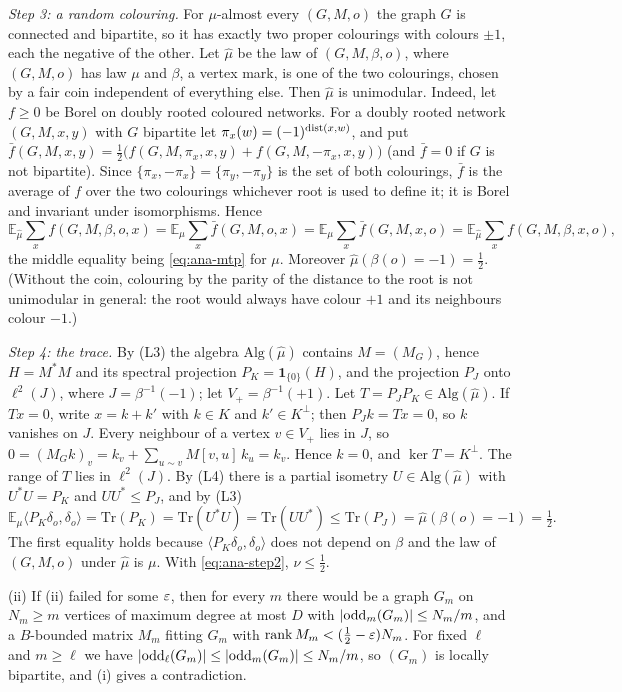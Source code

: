 \begin{informalproof}
\emph{Step 3: a random colouring.} For $\mu$-almost every $(G,M,o)$ the graph $G$ is connected and bipartite, so it has
exactly two proper colourings with colours $\pm1$, each the negative of the other. Let $\hat\mu$ be the law of
$(G,M,\beta,o)$, where $(G,M,o)$ has law $\mu$ and $\beta$, a vertex mark, is one of the two colourings, chosen by a fair
coin independent of everything else. Then $\hat\mu$ is unimodular. Indeed, let $f\ge0$ be Borel on doubly rooted
coloured networks. For a doubly rooted network $(G,M,x,y)$ with $G$ bipartite let $\pi_x(w)=(-1)^{\operatorname{dist}(x,w)}$, and put
$\bar f(G,M,x,y)=\frac12\bigl(f(G,M,\pi_x,x,y)+f(G,M,-\pi_x,x,y)\bigr)$ (and $\bar f=0$ if $G$ is not bipartite).
Since $\{\pi_x,-\pi_x\}=\{\pi_y,-\pi_y\}$ is the set of both colourings, $\bar f$ is the average of $f$ over the two
colourings whichever root is used to define it; it is Borel and invariant under isomorphisms. Hence
\[
  \mathbb{E}_{\hat\mu}\sum_xf(G,M,\beta,o,x)=\mathbb{E}_\mu\sum_x\bar f(G,M,o,x)
  =\mathbb{E}_\mu\sum_x\bar f(G,M,x,o)=\mathbb{E}_{\hat\mu}\sum_xf(G,M,\beta,x,o),
\]
the middle equality being \eqref{eq:ana-mtp} for $\mu$. Moreover $\hat\mu(\beta(o)=-1)=\frac12$. (Without the coin,
colouring by the parity of the distance to the root is not unimodular in general: the root would always have colour
$+1$ and its neighbours colour $-1$.)

\emph{Step 4: the trace.} By (L3) the algebra $\mathrm{Alg}(\hat\mu)$ contains $M=(M_G)$, hence $H=M^*M$ and its spectral
projection $P_K=\mathbf 1_{\{0\}}(H)$, and the projection $P_J$ onto $\ell^2(J)$, where $J=\beta^{-1}(-1)$; let
$V_+=\beta^{-1}(+1)$. Let $T=P_JP_K\in\mathrm{Alg}(\hat\mu)$. If $Tx=0$, write $x=k+k'$ with $k\in K$ and
$k'\in K^\perp$; then $P_Jk=Tx=0$, so $k$ vanishes on $J$. Every neighbour of a vertex $v\in V_+$ lies in $J$, so
$0=(M_Gk)_v=k_v+\sum_{u\sim v}M[v,u]\,k_u=k_v$. Hence $k=0$, and $\ker T=K^\perp$. The range of $T$ lies in
$\ell^2(J)$. By (L4) there is a partial isometry $U\in\mathrm{Alg}(\hat\mu)$ with $U^*U=P_K$ and $UU^*\le P_J$, and by
(L3)
\[
  \mathbb{E}_\mu\langle P_K\delta_o,\delta_o\rangle=\mathrm{Tr}(P_K)=\mathrm{Tr}(U^*U)=\mathrm{Tr}(UU^*)
  \le\mathrm{Tr}(P_J)=\hat\mu(\beta(o)=-1)=\tfrac12 .
\]
The first equality holds because $\langle P_K\delta_o,\delta_o\rangle$ does not depend on $\beta$ and the law of
$(G,M,o)$ under $\hat\mu$ is $\mu$. With \eqref{eq:ana-step2}, $\nu\le\frac12$.

(ii) If (ii) failed for some $\varepsilon$, then for every $m$ there would be a graph $G_m$ on $N_m\ge m$ vertices of maximum
degree at most $D$ with $\lvert \mathrm{odd}_m(G_m) \rvert\le N_m/m$, and a $B$-bounded matrix $M_m$ fitting $G_m$ with
$\operatorname{rank} M_m<(\frac12-\varepsilon)N_m$. For fixed $\ell$ and $m\ge\ell$ we have
$\lvert \mathrm{odd}_\ell(G_m) \rvert\le\lvert \mathrm{odd}_m(G_m) \rvert\le N_m/m$, so $(G_m)$ is locally bipartite, and (i)
gives a contradiction.


\end{informalproof}
